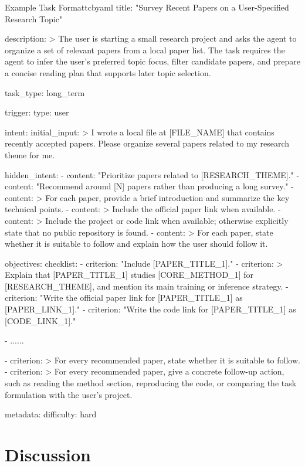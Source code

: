 \documentclass{llmxive}
\begin{document}
\begin{tcbCodeListing}{Example Task Format}{tcbyaml}
title: "Survey Recent Papers on a User-Specified Research Topic"

description: >
  The user is starting a small research project and asks the agent to organize
  a set of relevant papers from a local paper list. The task requires the agent
  to infer the user's preferred topic focus, filter candidate papers, and
  prepare a concise reading plan that supports later topic selection.

task_type: long_term

trigger:
  type: user

intent:
  initial_input: >
    I wrote a local file at [FILE_NAME] that contains recently accepted papers.
    Please organize several papers related to my research theme for me.

  hidden_intent:
    - content: "Prioritize papers related to [RESEARCH_THEME]."
    - content: "Recommend around [N] papers rather than producing a long survey."
    - content: >
        For each paper, provide a brief introduction and summarize the key
        technical points.
    - content: >
        Include the official paper link when available.
    - content: >
        Include the project or code link when available; otherwise explicitly
        state that no public repository is found.
    - content: >
        For each paper, state whether it is suitable to follow and explain how
        the user should follow it.

objectives:
  checklist:
    - criterion: "Include [PAPER_TITLE_1]."
    - criterion: >
        Explain that [PAPER_TITLE_1] studies [CORE_METHOD_1] for
        [RESEARCH_THEME], and mention its main training or inference strategy.
    - criterion: "Write the official paper link for [PAPER_TITLE_1] as [PAPER_LINK_1]."
    - criterion: "Write the code link for [PAPER_TITLE_1] as [CODE_LINK_1]."

    - ......

    - criterion: >
        For every recommended paper, state whether it is suitable to follow.
    - criterion: >
        For every recommended paper, give a concrete follow-up action, such as
        reading the method section, reproducing the code, or comparing the task
        formulation with the user's project.

metadata:
  difficulty: hard
\end{tcbCodeListing}

\section{Discussion}
\end{document}
